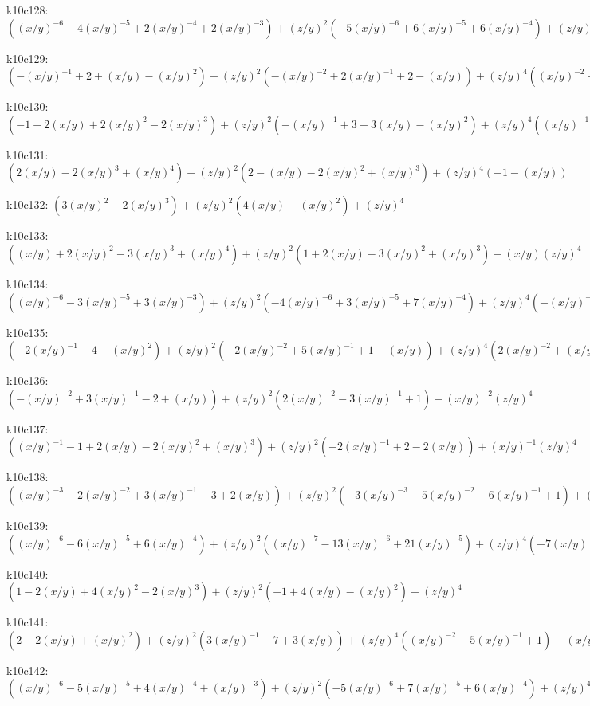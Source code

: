 k10c128: $ ((x/y)^{-6}-4(x/y)^{-5}+2(x/y)^{-4}+2(x/y)^{-3})  +(z/y)^{2}(-5(x/y)^{-6}+6(x/y)^{-5}+6(x/y)^{-4})  +(z/y)^{4}(-(x/y)^{-7}+5(x/y)^{-6}+5(x/y)^{-5})  +(z/y)^{6}((x/y)^{-7}+(x/y)^{-6}) $ 

k10c129: $ (-(x/y)^{-1}+2+(x/y)-(x/y)^{2})  +(z/y)^{2}(-(x/y)^{-2}+2(x/y)^{-1}+2-(x/y))  +(z/y)^{4}((x/y)^{-2}+(x/y)^{-1}) $ 

k10c130: $ (-1+2(x/y)+2(x/y)^{2}-2(x/y)^{3})  +(z/y)^{2}(-(x/y)^{-1}+3+3(x/y)-(x/y)^{2})  +(z/y)^{4}((x/y)^{-1}+1) $ 

k10c131: $ (2(x/y)-2(x/y)^{3}+(x/y)^{4})  +(z/y)^{2}(2-(x/y)-2(x/y)^{2}+(x/y)^{3})  +(z/y)^{4}(-1-(x/y)) $ 

k10c132: $ (3(x/y)^{2}-2(x/y)^{3})  +(z/y)^{2}(4(x/y)-(x/y)^{2})  +(z/y)^{4} $ 

k10c133: $ ((x/y)+2(x/y)^{2}-3(x/y)^{3}+(x/y)^{4})  +(z/y)^{2}(1+2(x/y)-3(x/y)^{2}+(x/y)^{3})  -(x/y)(z/y)^{4} $ 

k10c134: $ ((x/y)^{-6}-3(x/y)^{-5}+3(x/y)^{-3})  +(z/y)^{2}(-4(x/y)^{-6}+3(x/y)^{-5}+7(x/y)^{-4})  +(z/y)^{4}(-(x/y)^{-7}+4(x/y)^{-6}+5(x/y)^{-5})  +(z/y)^{6}((x/y)^{-7}+(x/y)^{-6}) $ 

k10c135: $ (-2(x/y)^{-1}+4-(x/y)^{2})  +(z/y)^{2}(-2(x/y)^{-2}+5(x/y)^{-1}+1-(x/y))  +(z/y)^{4}(2(x/y)^{-2}+(x/y)^{-1}) $ 

k10c136: $ (-(x/y)^{-2}+3(x/y)^{-1}-2+(x/y))  +(z/y)^{2}(2(x/y)^{-2}-3(x/y)^{-1}+1)  -(x/y)^{-2}(z/y)^{4} $ 

k10c137: $ ((x/y)^{-1}-1+2(x/y)-2(x/y)^{2}+(x/y)^{3})  +(z/y)^{2}(-2(x/y)^{-1}+2-2(x/y))  +(x/y)^{-1}(z/y)^{4} $ 

k10c138: $ ((x/y)^{-3}-2(x/y)^{-2}+3(x/y)^{-1}-3+2(x/y))  +(z/y)^{2}(-3(x/y)^{-3}+5(x/y)^{-2}-6(x/y)^{-1}+1)  +(z/y)^{4}(-(x/y)^{-4}+4(x/y)^{-3}-2(x/y)^{-2})  +(x/y)^{-4}(z/y)^{6} $ 

k10c139: $ ((x/y)^{-6}-6(x/y)^{-5}+6(x/y)^{-4})  +(z/y)^{2}((x/y)^{-7}-13(x/y)^{-6}+21(x/y)^{-5})  +(z/y)^{4}(-7(x/y)^{-7}+21(x/y)^{-6})  +(z/y)^{6}(-(x/y)^{-8}+8(x/y)^{-7})  +(x/y)^{-8}(z/y)^{8} $ 

k10c140: $ (1-2(x/y)+4(x/y)^{2}-2(x/y)^{3})  +(z/y)^{2}(-1+4(x/y)-(x/y)^{2})  +(z/y)^{4} $ 

k10c141: $ (2-2(x/y)+(x/y)^{2})  +(z/y)^{2}(3(x/y)^{-1}-7+3(x/y))  +(z/y)^{4}((x/y)^{-2}-5(x/y)^{-1}+1)  -(x/y)^{-2}(z/y)^{6} $ 

k10c142: $ ((x/y)^{-6}-5(x/y)^{-5}+4(x/y)^{-4}+(x/y)^{-3})  +(z/y)^{2}(-5(x/y)^{-6}+7(x/y)^{-5}+6(x/y)^{-4})  +(z/y)^{4}(-(x/y)^{-7}+5(x/y)^{-6}+5(x/y)^{-5})  +(z/y)^{6}((x/y)^{-7}+(x/y)^{-6}) $ 

